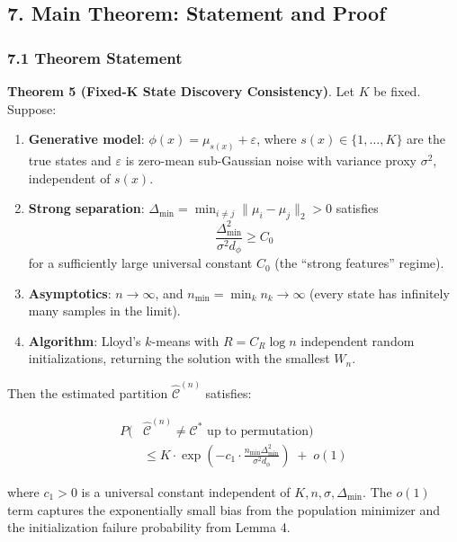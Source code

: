 \documentclass[
  12pt,
]{ctexart}
\begin{document}
\subsection{7. Main Theorem: Statement and
Proof}\label{main-theorem-statement-and-proof}

\subsubsection{7.1 Theorem Statement}\label{theorem-statement}

\textbf{Theorem 5 (Fixed-K State Discovery Consistency)}. Let \(K\) be
fixed. Suppose:

\begin{enumerate}
\def\labelenumi{\arabic{enumi}.}
\item
  \textbf{Generative model}: \(\phi(x) = \mu_{s(x)} + \varepsilon\),
  where \(s(x) \in \{1,\dots,K\}\) are the true states and
  \(\varepsilon\) is zero-mean sub-Gaussian noise with variance proxy
  \(\sigma^2\), independent of \(s(x)\).
\item
  \textbf{Strong separation}:
  \(\Delta_{\min} = \min_{i \neq j} \|\mu_i - \mu_j\|_2 > 0\) satisfies
  \[\frac{\Delta_{\min}^2}{\sigma^2 d_\phi} \geq C_0\] for a
  sufficiently large universal constant \(C_0\) (the ``strong features''
  regime).
\item
  \textbf{Asymptotics}: \(n \to \infty\), and
  \(n_{\min} = \min_k n_k \to \infty\) (every state has infinitely many
  samples in the limit).
\item
  \textbf{Algorithm}: Lloyd's \(k\)-means with \(R = C_R \log n\)
  independent random initializations, returning the solution with the
  smallest \(W_n\).
\end{enumerate}

Then the estimated partition \(\hat{\mathcal{C}}^{(n)}\) satisfies:

\[\begin{aligned}
P\bigl(&\hat{\mathcal{C}}^{(n)} \neq \mathcal{C}^* \text{ up to permutation}\bigr) \\
&\leq K \cdot \exp\left(-c_1 \cdot \frac{n_{\min} \Delta_{\min}^2}{\sigma^2 d_\phi}\right) \;+\; o(1)
\end{aligned}\]

where \(c_1 > 0\) is a universal constant independent of
\(K, n, \sigma, \Delta_{\min}\). The \(o(1)\) term captures the
exponentially small bias from the population minimizer and the
initialization failure probability from Lemma 4.
\end{document}
